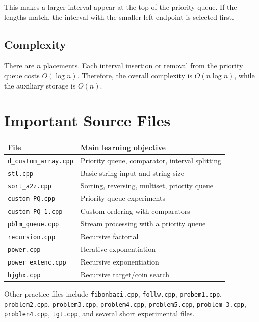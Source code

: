 \documentclass[12pt,a4paper]{article}
\begin{document}
This makes a larger interval appear at the top of the priority queue. If the
lengths match, the interval with the smaller left endpoint is selected first.

\subsection{Complexity}

There are \(n\) placements. Each interval insertion or removal from the
priority queue costs \(O(\log n)\). Therefore, the overall complexity is
\(O(n \log n)\), while the auxiliary storage is \(O(n)\).

\section{Important Source Files}

\begin{center}
\begin{tabular}{|l|l|}
\hline
\textbf{File} & \textbf{Main learning objective} \\
\hline
\texttt{d\_custom\_array.cpp} & Priority queue, comparator, interval splitting \\
\hline
\texttt{stl.cpp} & Basic string input and string size \\
\hline
\texttt{sort\_a2z.cpp} & Sorting, reversing, multiset, priority queue \\
\hline
\texttt{custom\_PQ.cpp} & Priority queue experiments \\
\hline
\texttt{custom\_PQ\_1.cpp} & Custom ordering with comparators \\
\hline
\texttt{pblm\_queue.cpp} & Stream processing with a priority queue \\
\hline
\texttt{recursion.cpp} & Recursive factorial \\
\hline
\texttt{power.cpp} & Iterative exponentiation \\
\hline
\texttt{power\_extenc.cpp} & Recursive exponentiation \\
\hline
\texttt{hjghx.cpp} & Recursive target/coin search \\
\hline
\end{tabular}
\end{center}

Other practice files include \texttt{fibonbaci.cpp}, \texttt{follw.cpp},
\texttt{probem1.cpp}, \texttt{problem2.cpp}, \texttt{problem3.cpp},
\texttt{problem4.cpp}, \texttt{problem5.cpp}, \texttt{problem\_3.cpp},
\texttt{problen4.cpp}, \texttt{tgt.cpp}, and several short experimental files.
\end{document}
